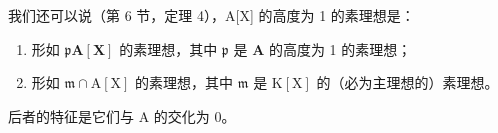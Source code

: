 我们还可以说（第 6 节，定理 4），A{[}X{]} 的高度为 1 的素理想是：

\begin{enumerate}
\def\labelenumi{(\arabic{enumi})}
\item
  形如 \(\mathfrak{p}\mathbf{A}[\mathbf{X}]\) 的素理想，其中 \(\mathfrak{p}\) 是 \(\mathbf{A}\) 的高度为 1 的素理想；
\item
  形如 \(\mathfrak{m} \cap \mathrm{A}[\mathrm{X}]\) 的素理想，其中 \(\mathfrak{m}\) 是 \(\mathrm{K}[\mathrm{X}]\) 的（必为主理想的）素理想。
\end{enumerate}

后者的特征是它们与 A 的交化为 0。

